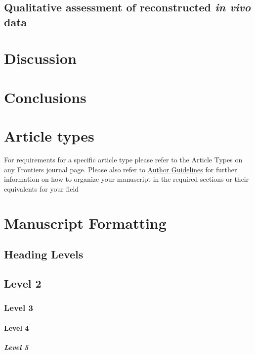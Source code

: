 \documentclass[utf8]{FrontiersinHarvard} %
\begin{document}
\subsection{Qualitative assessment of reconstructed \textit{in vivo} data}


\section{Discussion}


\section{Conclusions}



\section{Article types}

For requirements for a specific article type please refer to the Article Types on any Frontiers journal page. Please also refer to  \href{http://home.frontiersin.org/about/author-guidelines#Sections}{Author Guidelines} for further information on how to organize your manuscript in the required sections or their equivalents for your field


\section{Manuscript Formatting}

\subsection{Heading Levels}


\subsection{Level 2}
\subsubsection{Level 3}
\paragraph{Level 4}
\subparagraph{Level 5}
\end{document}
